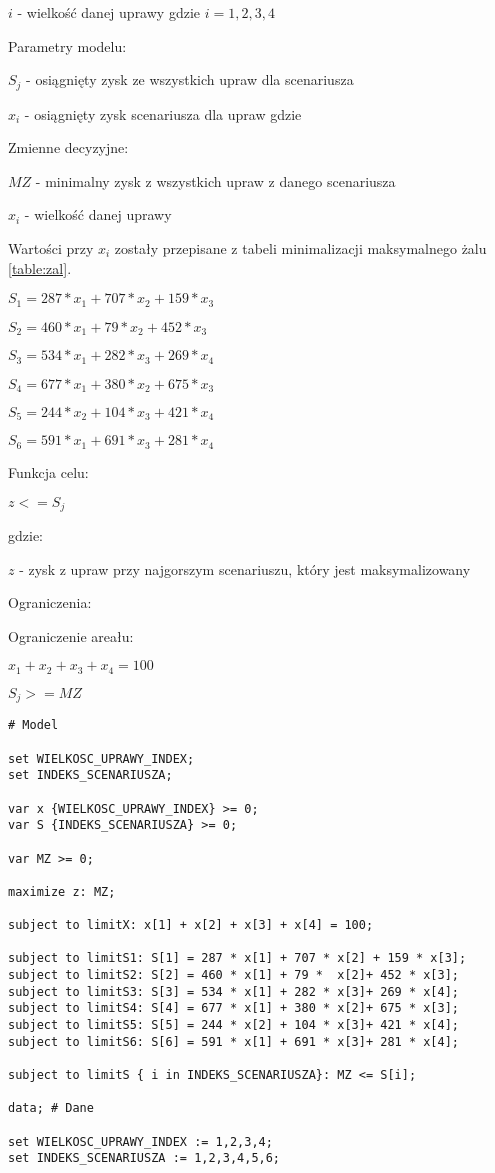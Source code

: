 \documentclass{article}
\begin{document}
$i$ - wielkość danej uprawy gdzie $i = {1,2,3,4}$

\noindent
Parametry modelu:

$S_j$ - osiągnięty zysk ze wszystkich upraw dla scenariusza

$x_i$ - osiągnięty zysk scenariusza dla upraw gdzie

\noindent
Zmienne decyzyjne:

$MZ$ - minimalny zysk z wszystkich upraw z danego scenariusza

$x_i$ - wielkość danej uprawy

Wartości przy $x_i$ zostały przepisane z tabeli minimalizacji maksymalnego żalu \ref{table:zal}.

$S_1 = 287 * x_1 + 707 * x_2 + 159 * x_3$

$S_2 = 460 * x_1 + 79 * x_2 + 452 * x_3$

$S_3 = 534 * x_1 + 282 * x_3 + 269 * x_4$

$S_4 = 677 * x_1 + 380 * x_2 + 675 * x_3$

$S_5 = 244 * x_2 + 104 * x_3 + 421 * x_4$

$S_6 = 591 * x_1 + 691 * x_3 + 281 * x_4$


\noindent
Funkcja celu:

$z <= S_j$ 

gdzie:

$z$ - zysk z upraw przy najgorszym scenariuszu, który jest maksymalizowany

\noindent
Ograniczenia:

\noindent
Ograniczenie areału:

$x_1 + x_2 + x_3 + x_4 = 100$

$S_j >= MZ$

\lstset{language=AMPL}
\begin{lstlisting}[caption={Model napisany w języku AMPL},label=DescriptiveLabel]
# Model

set WIELKOSC_UPRAWY_INDEX;
set INDEKS_SCENARIUSZA;

var x {WIELKOSC_UPRAWY_INDEX} >= 0;
var S {INDEKS_SCENARIUSZA} >= 0;

var MZ >= 0;

maximize z: MZ;

subject to limitX: x[1] + x[2] + x[3] + x[4] = 100;

subject to limitS1: S[1] = 287 * x[1] + 707 * x[2] + 159 * x[3];
subject to limitS2: S[2] = 460 * x[1] + 79 *  x[2]+ 452 * x[3];
subject to limitS3: S[3] = 534 * x[1] + 282 * x[3]+ 269 * x[4];
subject to limitS4: S[4] = 677 * x[1] + 380 * x[2]+ 675 * x[3];
subject to limitS5: S[5] = 244 * x[2] + 104 * x[3]+ 421 * x[4];
subject to limitS6: S[6] = 591 * x[1] + 691 * x[3]+ 281 * x[4];

subject to limitS { i in INDEKS_SCENARIUSZA}: MZ <= S[i];

data; # Dane

set WIELKOSC_UPRAWY_INDEX := 1,2,3,4;
set INDEKS_SCENARIUSZA := 1,2,3,4,5,6;
\end{lstlisting}
\end{document}

